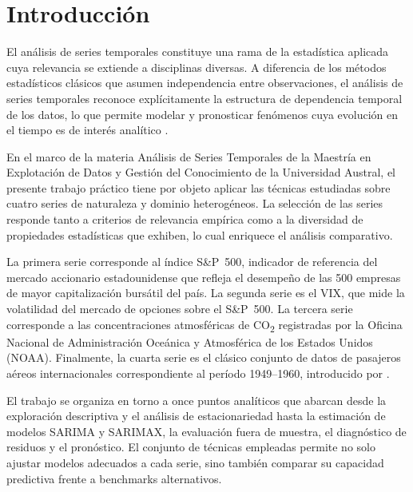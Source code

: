\documentclass[12pt, a4paper]{article}
\begin{document}
\newpage
\tableofcontents

\newpage
\section{Introducción}

El análisis de series temporales constituye una rama de la estadística aplicada cuya relevancia se extiende a disciplinas diversas. A diferencia de los métodos estadísticos clásicos que asumen independencia entre observaciones, el análisis de series temporales reconoce explícitamente la estructura de dependencia temporal de los datos, lo que permite modelar y pronosticar fenómenos cuya evolución en el tiempo es de interés analítico \cite{box2015}.

En el marco de la materia Análisis de Series Temporales de la Maestría en Explotación de Datos y Gestión del Conocimiento de la Universidad Austral, el presente trabajo práctico tiene por objeto aplicar las técnicas estudiadas sobre cuatro series de naturaleza y dominio heterogéneos. La selección de las series responde tanto a criterios de relevancia empírica como a la diversidad de propiedades estadísticas que exhiben, lo cual enriquece el análisis comparativo.

La primera serie corresponde al índice S\&P~500, indicador de referencia del mercado accionario estadounidense que refleja el desempeño de las 500 empresas de mayor capitalización bursátil del país. La segunda serie es el VIX, que mide la volatilidad del mercado de opciones sobre el S\&P~500. La tercera serie corresponde a las concentraciones atmosféricas de CO\textsubscript{2} registradas por la Oficina Nacional de Administración Oceánica y Atmosférica de los Estados Unidos (NOAA). Finalmente, la cuarta serie es el clásico conjunto de datos de pasajeros aéreos internacionales correspondiente al período 1949--1960, introducido por .

El trabajo se organiza en torno a once puntos analíticos que abarcan desde la exploración descriptiva y el análisis de estacionariedad hasta la estimación de modelos SARIMA y SARIMAX, la evaluación fuera de muestra, el diagnóstico de residuos y el pronóstico. El conjunto de técnicas empleadas permite no solo ajustar modelos adecuados a cada serie, sino también comparar su capacidad predictiva frente a benchmarks alternativos.
\end{document}
